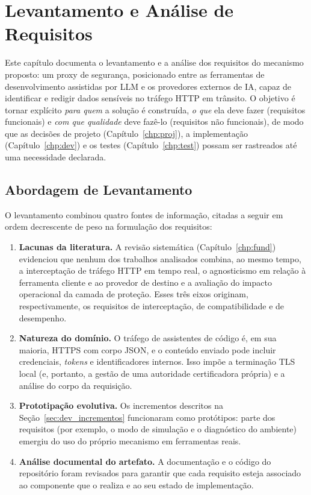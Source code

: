 \chapter{Levantamento e Análise de Requisitos}\label{chp:req}

Este capítulo documenta o levantamento e a análise dos requisitos do mecanismo proposto: um proxy de segurança, posicionado entre as ferramentas de desenvolvimento assistidas por LLM e os provedores externos de IA, capaz de identificar e redigir dados sensíveis no tráfego HTTP em trânsito. O objetivo é tornar explícito \textit{para quem} a solução é construída, \textit{o que} ela deve fazer (requisitos funcionais) e \textit{com que qualidade} deve fazê-lo (requisitos não funcionais), de modo que as decisões de projeto (Capítulo~\ref{chp:proj}), a implementação (Capítulo~\ref{chp:dev}) e os testes (Capítulo~\ref{chp:test}) possam ser rastreados até uma necessidade declarada.

\section{Abordagem de Levantamento}
\label{sec:req_abordagem}

O levantamento combinou quatro fontes de informação, citadas a seguir em ordem decrescente de peso na formulação dos requisitos:

\begin{enumerate}
    \item \textbf{Lacunas da literatura.} A revisão sistemática (Capítulo~\ref{chp:fund}) evidenciou que nenhum dos trabalhos analisados combina, ao mesmo tempo, a interceptação de tráfego HTTP em tempo real, o agnosticismo em relação à ferramenta cliente e ao provedor de destino e a avaliação do impacto operacional da camada de proteção. Esses três eixos originam, respectivamente, os requisitos de interceptação, de compatibilidade e de desempenho.
    \item \textbf{Natureza do domínio.} O tráfego de assistentes de código é, em sua maioria, HTTPS com corpo JSON, e o conteúdo enviado pode incluir credenciais, \textit{tokens} e identificadores internos. Isso impõe a terminação TLS local (e, portanto, a gestão de uma autoridade certificadora própria) e a análise do corpo da requisição.
    \item \textbf{Prototipação evolutiva.} Os incrementos descritos na Seção~\ref{sec:dev_incrementos} funcionaram como protótipos: parte dos requisitos (por exemplo, o modo de simulação e o diagnóstico do ambiente) emergiu do uso do próprio mecanismo em ferramentas reais.
    \item \textbf{Análise documental do artefato.} A documentação e o código do repositório foram revisados para garantir que cada requisito esteja associado ao componente que o realiza e ao seu estado de implementação.
\end{enumerate}

